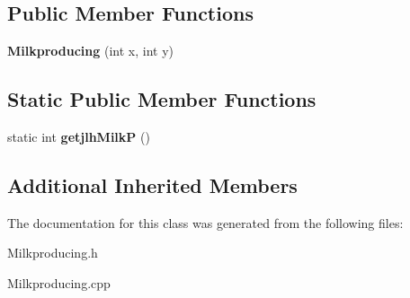 \subsection*{Public Member Functions}
\begin{DoxyCompactItemize}
\item 
\mbox{\label{classMilkproducing_a74aa25fa5febb55d3e422cebd2d6687a}} 
{\bfseries Milkproducing} (int x, int y)
\end{DoxyCompactItemize}
\subsection*{Static Public Member Functions}
\begin{DoxyCompactItemize}
\item 
\mbox{\label{classMilkproducing_a7ee5abf21d8711db0aa5b4060318aa95}} 
static int {\bfseries getjlh\+MilkP} ()
\end{DoxyCompactItemize}
\subsection*{Additional Inherited Members}


The documentation for this class was generated from the following files\+:\begin{DoxyCompactItemize}
\item 
Milkproducing.\+h\item 
Milkproducing.\+cpp\end{DoxyCompactItemize}
